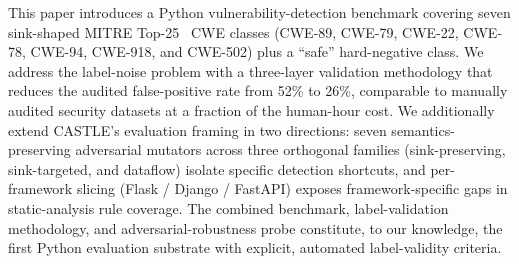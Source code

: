 This paper introduces a Python vulnerability-detection benchmark
covering seven sink-shaped MITRE Top-25~\cite{mitre_top25} CWE classes
(CWE-89, CWE-79, CWE-22, CWE-78, CWE-94, CWE-918, and CWE-502) plus a
``safe'' hard-negative class. We address the label-noise problem with a
three-layer validation methodology that reduces the audited
false-positive rate from 52\% to 26\%, comparable to manually audited
security datasets at a fraction of the human-hour cost. We additionally extend CASTLE's evaluation framing in two
directions: seven semantics-preserving adversarial mutators across
three orthogonal families (sink-preserving, sink-targeted, and
dataflow) isolate specific detection shortcuts, and per-framework
slicing (Flask / Django / FastAPI) exposes framework-specific gaps
in static-analysis rule coverage. The combined benchmark, label-validation methodology,
and adversarial-robustness probe constitute, to our knowledge, the
first Python evaluation substrate with explicit, automated
label-validity criteria.

